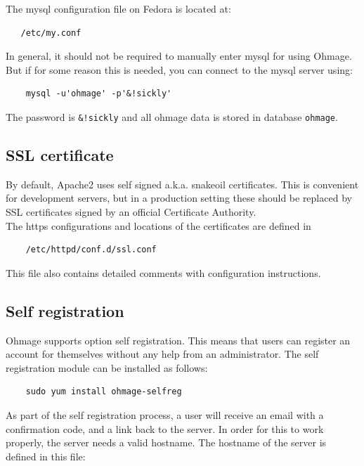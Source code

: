 \documentclass{scrartcl}
\begin{document}
The mysql configuration file on Fedora is located at:

\begin{verbatim}
   /etc/my.conf
\end{verbatim}
In general, it should not be required to manually enter mysql for using Ohmage.
But if for some reason this is needed, you can connect to the mysql server
using:

\begin{verbatim}
    mysql -u'ohmage' -p'&!sickly'
\end{verbatim}
The password is \texttt{\&!sickly} and all ohmage data is stored in database
\texttt{ohmage}.

\subsection{SSL certificate}
\label{ssl}

By default, Apache2 uses self signed a.k.a. snakeoil certificates. This is
convenient for development servers, but in a production setting these
should be replaced by SSL certificates signed by an official Certificate Authority. \\

\noindent The https configurations and locations of the certificates are defined
in

\begin{verbatim}
    /etc/httpd/conf.d/ssl.conf
\end{verbatim}
This file also contains detailed comments with configuration instructions.

\subsection{Self registration}
\label{selfreg}

Ohmage supports option self registration. This means that users can register an 
account for themselves without any help from an administrator. The self
registration module can be installed as follows:

\begin{verbatim}
    sudo yum install ohmage-selfreg
\end{verbatim}

\noindent As part of the self registration process, a user will receive an email
with a confirmation code, and a link back to the server. In order for this to
work properly, the server needs a valid hostname. The hostname of the server is
defined in this file:
\end{document}
